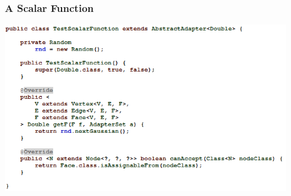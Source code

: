 \documentclass[12pt]{beamer}
\begin{document}
\begin{frame}
\frametitle{A Scalar Function}
\begin{center}
\includegraphics[height=7.4cm]{scalarfunction.png}\\	
\end{center}
\end{frame}

% 
\end{document}
